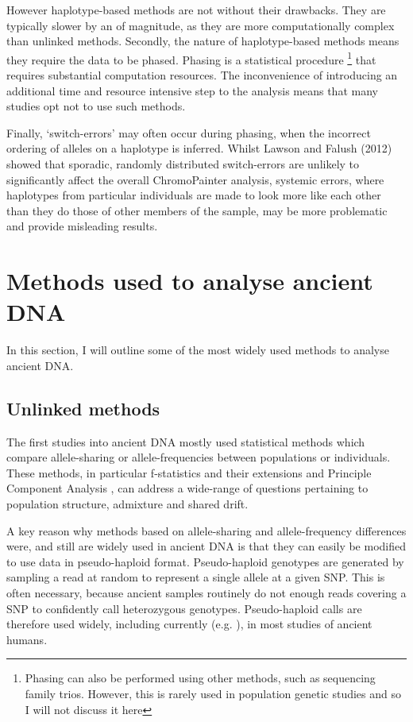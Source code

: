 However haplotype-based methods are not without their drawbacks. They are typically slower by an of magnitude, as they are more computationally complex than unlinked methods. Secondly, the nature of haplotype-based methods means they require the data to be phased. Phasing is a statistical procedure \footnote{Phasing can also be performed using other methods, such as sequencing family trios. However, this is rarely used in population genetic studies and so I will not discuss it here} that requires substantial computation resources. The inconvenience of introducing an additional time and resource intensive step to the analysis means that many studies opt not to use such methods. 

Finally, `switch-errors' may often occur during phasing, when the incorrect ordering of alleles on a haplotype is inferred. Whilst Lawson and Falush (2012) showed that sporadic, randomly distributed switch-errors are unlikely to significantly affect the overall ChromoPainter analysis, systemic errors, where haplotypes from particular individuals are made to look more like each other than they do those of other members of the sample, may be more problematic and provide misleading results\cite{LawsonFalushReview}. 

\section{Methods used to analyse ancient DNA}

In this section, I will outline some of the most widely used methods to analyse ancient DNA.

\subsection{Unlinked methods}

The first studies into ancient DNA mostly used statistical methods which compare allele-sharing or allele-frequencies between populations or individuals. These methods, in particular f-statistics and their extensions \cite{Green2010, Patterson2012, peter2016admixture, AssessingqpAdm} and Principle Component Analysis \cite{price2006principal}, can address a wide-range of questions pertaining to population structure, admixture and shared drift. 

A key reason why methods based on allele-sharing and allele-frequency differences were, and still are widely used in ancient DNA is that they can easily be modified to use data in pseudo-haploid format. Pseudo-haploid genotypes are generated by sampling a read at random to represent a single allele at a given SNP. This is often necessary, because ancient samples routinely do not enough reads covering a SNP to confidently call heterozygous genotypes. Pseudo-haploid calls are therefore used widely, including currently (e.g. \cite{sirak2021social}), in most studies of ancient humans. 


